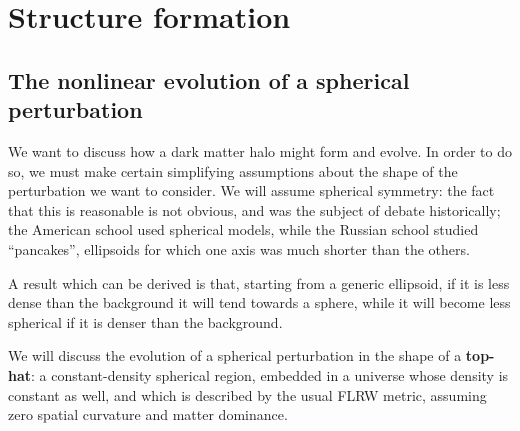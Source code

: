 \documentclass[main.tex]{subfiles}
\begin{document}





\chapter{Structure formation}

\section{The nonlinear evolution of a spherical perturbation}

We want to discuss how a dark matter halo might form and evolve.
In order to do so, we must make certain simplifying assumptions about the shape of the perturbation we want to consider.
We will assume spherical symmetry: the fact that this is reasonable is not obvious, and was the subject of debate historically; the American school used spherical models, while the Russian school studied ``pancakes'', ellipsoids for which one axis was much shorter than the others.

A result which can be derived is that, starting from a generic ellipsoid, if it is less dense than the background it will tend towards a sphere, while it will become less spherical if it is denser than the background.

We will discuss the evolution of a spherical perturbation in the shape of a \textbf{top-hat}: a constant-density spherical region, embedded in a universe whose density is constant as well, and which is described by the usual FLRW metric, assuming zero spatial curvature and matter dominance.
\end{document}
